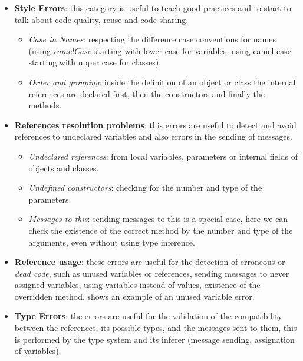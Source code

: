 \begin{itemize}
  \item \textbf{Style Errors}: this category is useful to teach good practices and to start to talk about code quality, reuse and code sharing.
	\begin{itemize}
		\item \textit{Case in Names}: respecting the difference case conventions for
		names (\eg using \textit{camelCase} starting with lower case for variables,
		using camel case starting with upper case for classes).
		\item \textit{Order and grouping}: inside the definition of an object or class the internal references are declared first, then the constructors and finally the methods.
	\end{itemize}
  \item \textbf{References resolution problems}: this errors are useful to detect and avoid references to undeclared variables and also errors in the sending of messages.
  
	\begin{itemize}
	  \item \textit{Undeclared references}: from local variables, parameters or internal fields of objects and classes.
	  \item \textit{Undefined constructors}: checking for the number and type of the parameters.
	  \item \textit{Messages to this}: sending messages to this is a special case, here we can check the existence of the correct method by the number and type of the arguments, even without using type inference.
	\end{itemize}
	
  \item \textbf{Reference usage}: 
		these errors are useful for the detection of erroneous or \textit{dead code}, such as unused variables or references, 
		sending messages to never assigned variables, using variables instead of values, existence of the overridden method.
		 shows an example of an unused variable error.

  \item \textbf{Type Errors}: the errors are useful for the validation of the compatibility between the references, its possible types, and the messages sent to them, this is performed by the type system and its inferer (\eg message sending, assignation of variables).
\end{itemize}

